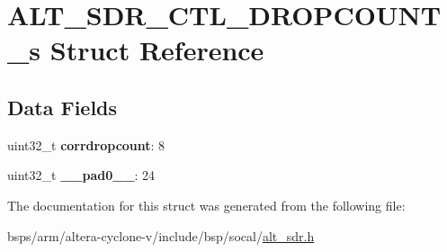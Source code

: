 \hypertarget{structALT__SDR__CTL__DROPCOUNT__s}{}\section{A\+L\+T\+\_\+\+S\+D\+R\+\_\+\+C\+T\+L\+\_\+\+D\+R\+O\+P\+C\+O\+U\+N\+T\+\_\+s Struct Reference}
\label{structALT__SDR__CTL__DROPCOUNT__s}
\subsection*{Data Fields}
\begin{DoxyCompactItemize}
\item 
\mbox{\label{structALT__SDR__CTL__DROPCOUNT__s_a4ab023761f74926cde6823bc9f84aae2}} 
uint32\+\_\+t {\bfseries corrdropcount}\+: 8
\item 
\mbox{\label{structALT__SDR__CTL__DROPCOUNT__s_afcf8343c410d3de33c810f820c58f154}} 
uint32\+\_\+t {\bfseries \+\_\+\+\_\+pad0\+\_\+\+\_\+}\+: 24
\end{DoxyCompactItemize}


The documentation for this struct was generated from the following file\+:\begin{DoxyCompactItemize}
\item 
bsps/arm/altera-\/cyclone-\/v/include/bsp/socal/\mbox{\hyperlink{alt__sdr_8h}{alt\+\_\+sdr.\+h}}\end{DoxyCompactItemize}
